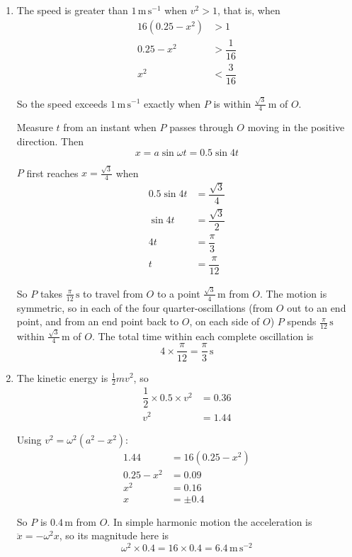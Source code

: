 \documentclass[leqno]{article}
\begin{document}
\begin{enumerate}[
  label=\textbf{\arabic*.},
  leftmargin=*,
  topsep=0pt,
  partopsep=0pt,
  parsep=0pt
]
\begin{djsSolution}
\begin{enumerate}[label=\textbf{(\alph*)}, start=1]
So the amplitude of the motion is \(0.5\,\mathrm{m}\), as required.

\item The speed is greater than \(1\,\mathrm{m\,s^{-1}}\) when \(v^2>1\), that is, when
\begin{align*}
16\left(0.25-x^2\right)&>1\\
0.25-x^2&>\dfrac{1}{16}\\
x^2&<\dfrac{3}{16}
\end{align*}

So the speed exceeds \(1\,\mathrm{m\,s^{-1}}\) exactly when \(P\) is within \(\frac{\sqrt{3}}{4}\,\mathrm{m}\) of \(O\).

Measure \(t\) from an instant when \(P\) passes through \(O\) moving in the positive direction. Then
\[
x=a\sin\omega t=0.5\sin 4t
\]

\(P\) first reaches \(x=\frac{\sqrt{3}}{4}\) when
\begin{align*}
0.5\sin 4t&=\dfrac{\sqrt{3}}{4}\\
\sin 4t&=\dfrac{\sqrt{3}}{2}\\
4t&=\dfrac{\pi}{3}\\
t&=\dfrac{\pi}{12}
\end{align*}

So \(P\) takes \(\frac{\pi}{12}\,\mathrm{s}\) to travel from \(O\) to a point \(\frac{\sqrt{3}}{4}\,\mathrm{m}\) from \(O\). The motion is symmetric, so in each of the four quarter-oscillations (from \(O\) out to an end point, and from an end point back to \(O\), on each side of \(O\)) \(P\) spends \(\frac{\pi}{12}\,\mathrm{s}\) within \(\frac{\sqrt{3}}{4}\,\mathrm{m}\) of \(O\). The total time within each complete oscillation is
\[
4\times\dfrac{\pi}{12}=\dfrac{\pi}{3}\,\mathrm{s}
\]

\item The kinetic energy is \(\frac12 mv^2\), so
\begin{align*}
\dfrac12\times 0.5\times v^2&=0.36\\
v^2&=1.44
\end{align*}

Using \(v^2=\omega^2\left(a^2-x^2\right)\):
\begin{align*}
1.44&=16\left(0.25-x^2\right)\\
0.25-x^2&=0.09\\
x^2&=0.16\\
x&=\pm 0.4
\end{align*}

So \(P\) is \(0.4\,\mathrm{m}\) from \(O\). In simple harmonic motion the acceleration is \(\ddot{x}=-\omega^2x\), so its magnitude here is
\[
\omega^2\times 0.4=16\times 0.4=6.4\,\mathrm{m\,s^{-2}}
\]


\end{enumerate}
\end{djsSolution}
\end{enumerate}
\end{document}
